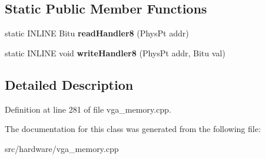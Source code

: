 \subsection*{Static Public Member Functions}
\begin{DoxyCompactItemize}
\item 
\hypertarget{classVGA__ChainedVGA__Slow__Handler_a2c5d68cdb3b70c99d265eea42d938fce}{static I\-N\-L\-I\-N\-E Bitu {\bfseries read\-Handler8} (Phys\-Pt addr)}\label{classVGA__ChainedVGA__Slow__Handler_a2c5d68cdb3b70c99d265eea42d938fce}

\item 
\hypertarget{classVGA__ChainedVGA__Slow__Handler_a26b66b53a5e61455ae92a9c394a6d6b7}{static I\-N\-L\-I\-N\-E void {\bfseries write\-Handler8} (Phys\-Pt addr, Bitu val)}\label{classVGA__ChainedVGA__Slow__Handler_a26b66b53a5e61455ae92a9c394a6d6b7}

\end{DoxyCompactItemize}


\subsection{Detailed Description}


Definition at line 281 of file vga\-\_\-memory.\-cpp.



The documentation for this class was generated from the following file\-:\begin{DoxyCompactItemize}
\item 
src/hardware/vga\-\_\-memory.\-cpp\end{DoxyCompactItemize}
